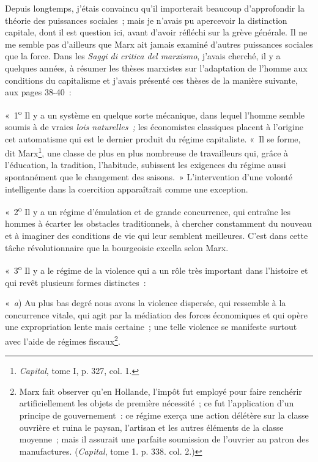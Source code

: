 \documentclass[french,twoside]{book} %
\begin{document}
\noindent Depuis longtemps, j’étais convaincu qu’il importerait beaucoup d’approfondir la théorie des puissances sociales ; mais je n’avais pu apercevoir la distinction capitale, dont il est question ici, avant d’avoir réfléchi sur la grève générale. Il ne me semble pas d’ailleurs que Marx ait jamais examiné d’autres puissances sociales que la force. Dans les \emph{Saggi di critica del marxismo}, j’avais cherché, il y a quelques années, à résumer les thèses marxistes sur l’adaptation de l’homme aux conditions du capitalisme  et j’avais présenté ces thèses de la manière suivante, aux pages 38-40 :\par
« 1\textsuperscript{o} Il y a un système en quelque sorte mécanique, dans lequel l’homme semble soumis à de vraies \emph{lois naturelles ;} les économistes classiques placent à l’origine cet automatisme qui est le dernier produit du régime capitaliste. « Il se forme, dit Marx\footnote{ \noindent \emph{Capital}, tome I, p. 327, col. 1.
 }, une classe de plus en plus nombreuse de travailleurs qui, grâce à l’éducation, la tradition, l’habitude, subissent les exigences du régime aussi spontanément que le changement des saisons. » L’intervention d’une volonté intelligente dans la coercition apparaîtrait comme une exception.\par
« 2\textsuperscript{o} Il y a un régime d’émulation et de grande concurrence, qui entraîne les hommes à écarter les obstacles traditionnels, à chercher constamment du nouveau et à imaginer des conditions de vie qui leur semblent meilleures. C’est dans cette tâche révolutionnaire que la bourgeoisie excella selon Marx.\par
« 3\textsuperscript{o} Il y a le régime de la violence qui a un rôle très important dans l’histoire et qui revêt plusieurs formes distinctes :\par
« \emph{a}) Au plus bas degré nous avons la violence dispersée, qui ressemble à la concurrence vitale, qui agit par la médiation des forces économiques et qui opère une expropriation lente mais certaine ; une telle violence se manifeste surtout avec l’aide de régimes fiscaux\footnote{ \noindent Marx fait observer qu’en Hollande, l’impôt fut employé pour faire renchérir artificiellement les objets de première nécessité ; ce fut l’application d’un principe de gouvernement : ce régime exerça une action délétère sur la classe ouvrière et ruina le paysan, l’artisan et les autres éléments de la classe moyenne ; mais il assurait une parfaite soumission de l’ouvrier au patron des manufactures. (\emph{Capital}, tome 1. p. 338. col. 2.)
 }.\par
\end{document}
